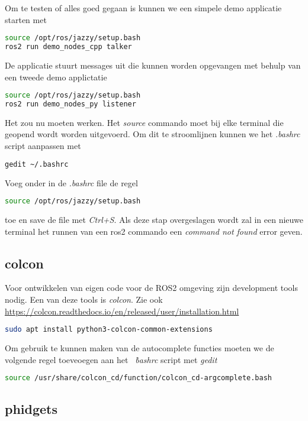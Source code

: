 \documentclass[12pt,a4paper]{exam}
\begin{document}
Om te testen of alles goed gegaan is kunnen we een simpele demo applicatie starten met
\begin{lstlisting}[language=bash]
source /opt/ros/jazzy/setup.bash
ros2 run demo_nodes_cpp talker
\end{lstlisting}
De applicatie stuurt messages uit die kunnen worden opgevangen met behulp van een tweede demo applictatie
\begin{lstlisting}[language=bash]
source /opt/ros/jazzy/setup.bash
ros2 run demo_nodes_py listener
\end{lstlisting}
Het zou nu moeten werken. Het \textit{source} commando moet bij elke terminal die geopend wordt worden uitgevoerd. Om dit te stroomlijnen kunnen we het \textit{.bashrc} script aanpassen met
\begin{lstlisting}[language=bash]
gedit ~/.bashrc
\end{lstlisting}
Voeg onder in de \textit{.bashrc} file de regel
\begin{lstlisting}[language=bash]
source /opt/ros/jazzy/setup.bash
\end{lstlisting}
toe en save de file met \textit{Ctrl+S}. Als deze stap overgeslagen wordt zal in een nieuwe terminal het runnen van een ros2 commando een \textit{command not found} error geven.

\subsection{colcon}
Voor ontwikkelen van eigen code voor de ROS2 omgeving zijn development tools nodig. Een van deze tools is \textit{colcon}. Zie ook\\
{\small \url{https://colcon.readthedocs.io/en/released/user/installation.html}}
\begin{lstlisting}[language=bash]
sudo apt install python3-colcon-common-extensions
\end{lstlisting}
Om gebruik te kunnen maken van de autocomplete functies moeten we de volgende regel toeveoegen aan het \textit{~\.bashrc} script met \textit{gedit}
\begin{lstlisting}[language=bash]
source /usr/share/colcon_cd/function/colcon_cd-argcomplete.bash
\end{lstlisting}



\subsection{phidgets}
\end{document}
